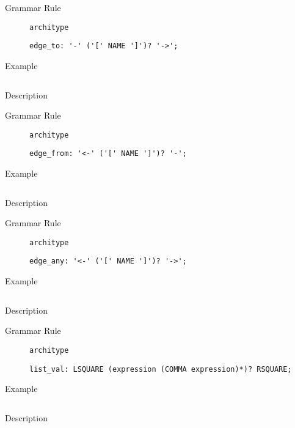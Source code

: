 \begin{description}
    \item[Grammar Rule] \texttt{architype}
          \begin{lstlisting}[style=gram]
edge_to: '-' ('[' NAME ']')? '->';
\end{lstlisting}
    \item[Example] \texttt{}
          \begin{lstlisting}
    \end{lstlisting}

    \item[Description]
\end{description}


\begin{description}
    \item[Grammar Rule] \texttt{architype}
          \begin{lstlisting}[style=gram]
edge_from: '<-' ('[' NAME ']')? '-';
\end{lstlisting}
    \item[Example] \texttt{}
          \begin{lstlisting}
    \end{lstlisting}

    \item[Description]
\end{description}


\begin{description}
    \item[Grammar Rule] \texttt{architype}
          \begin{lstlisting}[style=gram]
edge_any: '<-' ('[' NAME ']')? '->';
\end{lstlisting}
    \item[Example] \texttt{}
          \begin{lstlisting}
    \end{lstlisting}

    \item[Description]
\end{description}


\begin{description}
    \item[Grammar Rule] \texttt{architype}
          \begin{lstlisting}[style=gram]
list_val: LSQUARE (expression (COMMA expression)*)? RSQUARE;
\end{lstlisting}
    \item[Example] \texttt{}
          \begin{lstlisting}
    \end{lstlisting}

    \item[Description]
\end{description}


